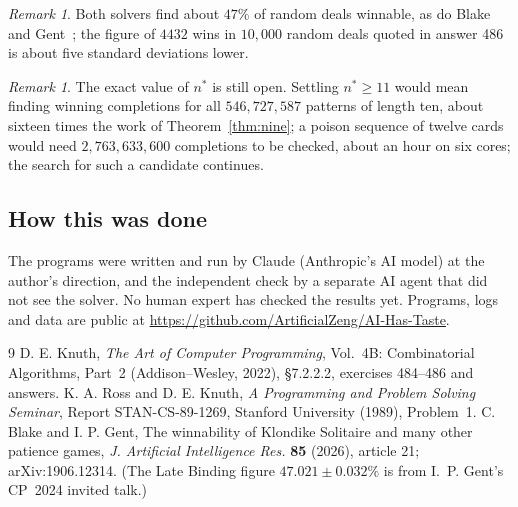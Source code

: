 \documentclass[11pt]{amsart}
\theoremstyle{remark}
\newtheorem{remark}[theorem]{Remark}
\begin{document}
\begin{remark}
Both solvers find about $47\%$ of random deals winnable, as do Blake and Gent~\cite{gent}; the figure of $4432$ wins in
$10{,}000$ random deals quoted in answer 486 is about five standard deviations lower.
\end{remark}

\begin{remark}
The exact value of $n^*$ is still open. Settling $n^*\ge11$ would mean finding winning completions for all
$546{,}727{,}587$ patterns of length ten, about sixteen times the work of Theorem~\ref{thm:nine}; a poison sequence of
twelve cards would need $2{,}763{,}633{,}600$ completions to be checked, about an hour on six cores; the search for
such a candidate continues.
\end{remark}

\subsection*{How this was done}
The programs were written and run by Claude (Anthropic's AI model) at the author's direction, and the independent check
by a separate AI agent that did not see the solver. No human expert has checked the results yet. Programs, logs and
data are public at \url{https://github.com/ArtificialZeng/AI-Has-Taste}.

\begin{thebibliography}{9}
 D. E. Knuth, \emph{The Art of Computer Programming}, Vol.~4B: Combinatorial Algorithms, Part~2
(Addison--Wesley, 2022), \S7.2.2.2, exercises 484--486 and answers.
 K. A. Ross and D. E. Knuth, \emph{A Programming and Problem Solving Seminar}, Report STAN-CS-89-1269,
Stanford University (1989), Problem~1.
 C. Blake and I. P. Gent, The winnability of Klondike Solitaire and many other patience games,
\emph{J. Artificial Intelligence Res.} \textbf{85} (2026), article 21; arXiv:1906.12314. (The Late Binding figure
$47.021\pm0.032\%$ is from I.~P. Gent's CP~2024 invited talk.)
\end{thebibliography}
\end{document}
